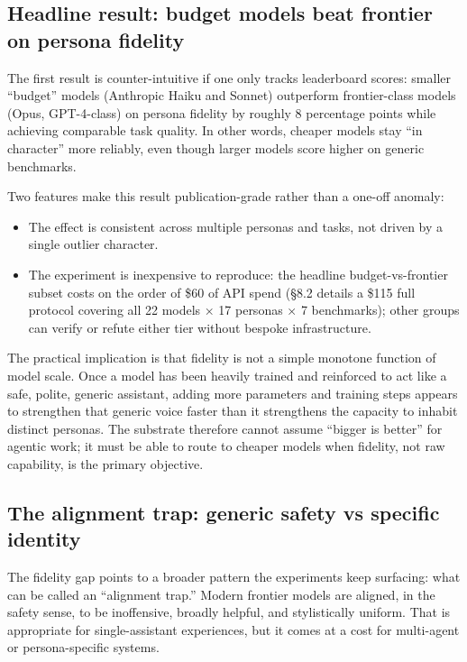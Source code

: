 \subsection{Headline result: budget models beat frontier on
persona
fidelity}\label{headline-result-budget-models-beat-frontier-on-persona-fidelity}

The first result is counter-intuitive if one only tracks leaderboard
scores: smaller ``budget'' models (Anthropic Haiku and Sonnet)
outperform frontier-class models (Opus, GPT-4-class) on persona fidelity
by roughly 8 percentage points while achieving comparable task quality.
In other words, cheaper models stay ``in character'' more reliably, even
though larger models score higher on generic benchmarks.

Two features make this result publication-grade rather than a one-off
anomaly:

\begin{itemize}
\tightlist
\item
  The effect is consistent across multiple personas and tasks, not
  driven by a single outlier character.
\item
  The experiment is inexpensive to reproduce: the headline
  budget-vs-frontier subset costs on the order of \$60 of API spend
  (§8.2 details a \$115 full protocol covering all 22 models × 17
  personas × 7 benchmarks); other groups can verify or refute either
  tier without bespoke infrastructure.
\end{itemize}

The practical implication is that fidelity is not a simple monotone
function of model scale. Once a model has been heavily trained and
reinforced to act like a safe, polite, generic assistant, adding more
parameters and training steps appears to strengthen that generic voice
faster than it strengthens the capacity to inhabit distinct personas.
The substrate therefore cannot assume ``bigger is better'' for agentic
work; it must be able to route to cheaper models when fidelity, not raw
capability, is the primary objective.

\subsection{The alignment trap: generic safety vs specific
identity}\label{the-alignment-trap-generic-safety-vs-specific-identity}

The fidelity gap points to a broader pattern the experiments keep
surfacing: what can be called an ``alignment trap.'' Modern frontier
models are aligned, in the safety sense, to be inoffensive, broadly
helpful, and stylistically uniform. That is appropriate for
single-assistant experiences, but it comes at a cost for multi-agent or
persona-specific systems.

